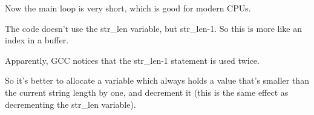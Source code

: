 Now the main loop is very short, which is good for modern \ac{CPU}s.

The code doesn't use the str\_len variable, but str\_len-1.
So this is more like an index in a buffer.

Apparently, GCC notices that the str\_len-1 statement is used twice.

So it's better to allocate a variable which always holds a value that's smaller than 
the current string length by one, 
and decrement it (this is the same effect as decrementing the str\_len variable).
